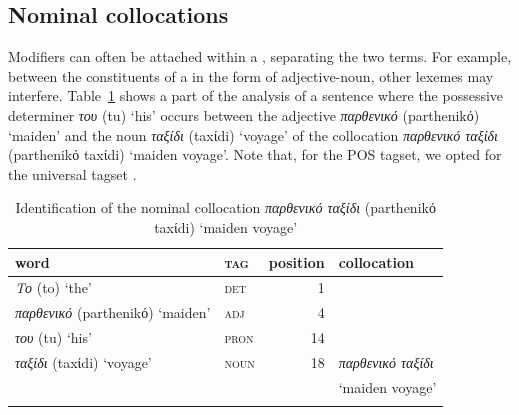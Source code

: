 \documentclass[output=paper]{langsci/langscibook}
\begin{document}
\eal\label{fou:exMinister}
\zl

\subsection{ Nominal collocations}
Modifiers can often be attached within a , separating the two terms. For example, between the constituents of a  in the form of adjective-noun, other lexemes may interfere. Table~\ref{fou:fig1} shows a part of the analysis of a sentence where the possessive determiner \textit{του} (tu) `his' occurs between the adjective  \textit{παρθενικό} (parthenikό) `maiden' and the noun \textit{ταξίδι} (taxίdi) `voyage' of the collocation \textit{παρθενικό ταξίδι} (parthenikό taxίdi) `maiden voyage'. Note that, for the POS tagset, we opted for the universal tagset \citep{petrov12}. 

\begin{table}[h]
  {\small
    \begin{tabular}{l>{\scshape}lrl}
      \lsptoprule
      word & \normalfont tag & position & collocation \\ %
      \midrule
          \textit{Το} (to) `the'                   & det & 1\\
          \textit{παρθενικό} (parthenikό) `maiden' & adj & 4 \\
          \textit{του } (tu) `his'                 & pron & 14 \\
          \textit{ταξίδι} (taxίdi) `voyage'        & noun & 18 & \textit{παρθενικό ταξίδι} \\
          & & & `maiden voyage' \tabularnewline
          \lspbottomrule
    \end{tabular}
  }
\caption{\label{fou:fig1}Identification of the nominal collocation \textit{παρθενικό ταξίδι} (parthenikό taxίdi) `maiden voyage'}
\end{table} 
\end{document}
